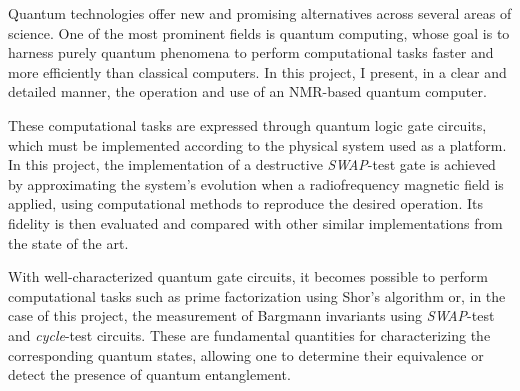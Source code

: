 Quantum technologies offer new and promising alternatives across several areas of science. One of the most prominent fields is quantum computing, whose goal is to harness purely quantum phenomena to perform computational tasks faster and more efficiently than classical computers. In this project, I present, in a clear and detailed manner, the operation and use of an NMR-based quantum computer.

These computational tasks are expressed through quantum logic gate circuits, which must be implemented according to the physical system used as a platform. In this project, the implementation of a destructive \emph{SWAP}-test gate is achieved by approximating the system’s evolution when a radiofrequency magnetic field is applied, using computational methods to reproduce the desired operation. Its fidelity is then evaluated and compared with other similar implementations from the state of the art.

With well-characterized quantum gate circuits, it becomes possible to perform computational tasks such as prime factorization using Shor’s algorithm or, in the case of this project, the measurement of Bargmann invariants using \emph{SWAP}-test and \emph{cycle}-test circuits. These are fundamental quantities for characterizing the corresponding quantum states, allowing one to determine their equivalence or detect the presence of quantum entanglement.
